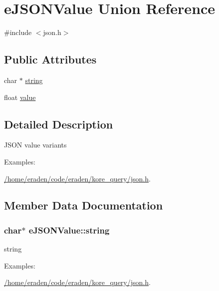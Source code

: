 \hypertarget{unioneJSONValue}{}\section{e\+J\+S\+O\+N\+Value Union Reference}
\label{unioneJSONValue}


{\ttfamily \#include $<$json.\+h$>$}

\subsection*{Public Attributes}
\begin{DoxyCompactItemize}
\item 
char $\ast$ \hyperlink{unioneJSONValue_a3af3c31add822d679ce6b66425f5f783}{string}
\item 
float \hyperlink{unioneJSONValue_ab11e9f87db2db5f129e49acefe49072c}{value}
\end{DoxyCompactItemize}


\subsection{Detailed Description}
J\+S\+ON value variants \begin{Desc}
\item[Examples\+: ]\par
\hyperlink{_2home_2eraden_2code_2eraden_2kore_query_2json_8h-example}{/home/eraden/code/eraden/kore\+\_\+query/json.\+h}.\end{Desc}


\subsection{Member Data Documentation}
\subsubsection[{\texorpdfstring{string}{string}}]{\setlength{\rightskip}{0pt plus 5cm}char$\ast$ e\+J\+S\+O\+N\+Value\+::string}\hypertarget{unioneJSONValue_a3af3c31add822d679ce6b66425f5f783}{}\label{unioneJSONValue_a3af3c31add822d679ce6b66425f5f783}
string \begin{Desc}
\item[Examples\+: ]\par
\hyperlink{_2home_2eraden_2code_2eraden_2kore_query_2json_8h-example}{/home/eraden/code/eraden/kore\+\_\+query/json.\+h}.\end{Desc}
